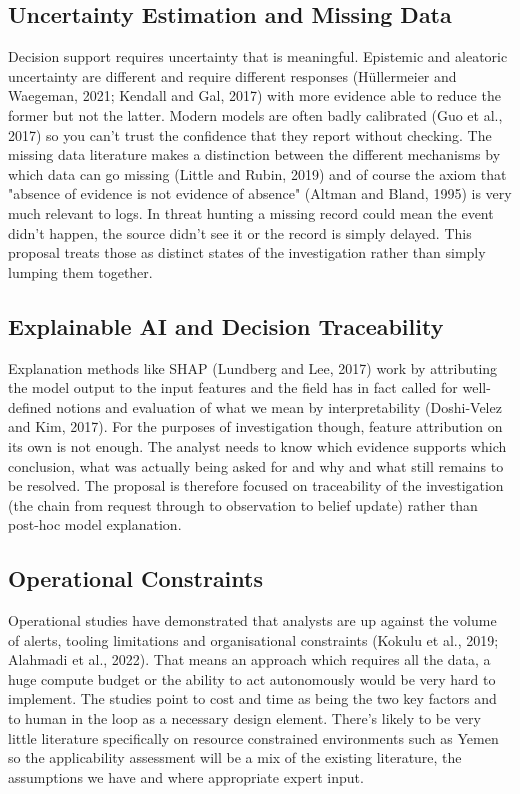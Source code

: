 \documentclass[a4paper,11pt]{article}
\begin{document}
\subsection{Uncertainty Estimation and Missing Data}
Decision support requires uncertainty that is meaningful. Epistemic and aleatoric uncertainty are different and require different responses (Hüllermeier and Waegeman, 2021; Kendall and Gal, 2017) with more evidence able to reduce the former but not the latter. Modern models are often badly calibrated (Guo et al., 2017) so you can't trust the confidence that they report without checking. The missing data literature makes a distinction between the different mechanisms by which data can go missing (Little and Rubin, 2019) and of course the axiom that "absence of evidence is not evidence of absence" (Altman and Bland, 1995) is very much relevant to logs. In threat hunting a missing record could mean the event didn't happen, the source didn't see it or the record is simply delayed. This proposal treats those as distinct states of the investigation rather than simply lumping them together.\par
\subsection{Explainable AI and Decision Traceability}
Explanation methods like SHAP (Lundberg and Lee, 2017) work by attributing the model output to the input features and the field has in fact called for well-defined notions and evaluation of what we mean by interpretability (Doshi-Velez and Kim, 2017). For the purposes of investigation though, feature attribution on its own is not enough. The analyst needs to know which evidence supports which conclusion, what was actually being asked for and why and what still remains to be resolved. The proposal is therefore focused on traceability of the investigation (the chain from request through to observation to belief update) rather than post-hoc model explanation.\par
\subsection{Operational Constraints}
Operational studies have demonstrated that analysts are up against the volume of alerts, tooling limitations and organisational constraints (Kokulu et al., 2019; Alahmadi et al., 2022). That means an approach which requires all the data, a huge compute budget or the ability to act autonomously would be very hard to implement. The studies point to cost and time as being the two key factors and to human in the loop as a necessary design element. There's likely to be very little literature specifically on resource constrained environments such as Yemen so the applicability assessment will be a mix of the existing literature, the assumptions we have and where appropriate expert input.\par
\end{document}
